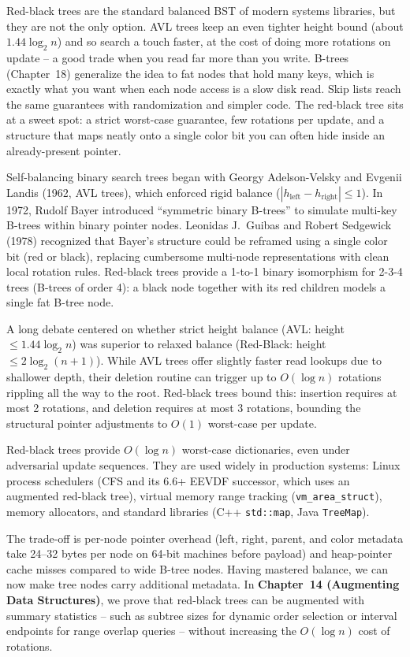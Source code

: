 \begin{aestheticbox}
Red-black trees are the standard balanced BST of modern systems libraries, but
they are not the only option. AVL trees keep an even tighter height
bound (about $1.44\log_2 n$) and so search a touch faster, at the cost of doing
more rotations on update -- a good trade when you read far more than you write.
B-trees (Chapter~18) generalize the idea to fat nodes that hold many keys, which
is exactly what you want when each node access is a slow disk read. Skip lists
reach the same guarantees with randomization and simpler code. The red-black tree
sits at a sweet spot: a strict worst-case guarantee, few rotations per update, and
a structure that maps neatly onto a single color bit you can often hide inside an
already-present pointer.
\end{aestheticbox}

\begin{historybox}
Self-balancing binary search trees began with Georgy Adelson-Velsky and Evgenii Landis (1962, AVL trees), which enforced rigid balance ($|h_{\text{left}} - h_{\text{right}}| \le 1$). In 1972, Rudolf Bayer introduced ``symmetric binary B-trees'' to simulate multi-key B-trees within binary pointer nodes. Leonidas J.~Guibas and Robert Sedgewick (1978) recognized that Bayer's structure could be reframed using a single color bit (red or black), replacing cumbersome multi-node representations with clean local rotation rules. Red-black trees provide a 1-to-1 binary isomorphism for 2-3-4 trees (B-trees of order 4): a black node together with its red children models a single fat B-tree node.

A long debate centered on whether strict height balance (AVL: height $\le 1.44 \log_2 n$) was superior to relaxed balance (Red-Black: height $\le 2 \log_2(n+1)$). While AVL trees offer slightly faster read lookups due to shallower depth, their deletion routine can trigger up to $O(\log n)$ rotations rippling all the way to the root. Red-black trees bound this: insertion requires at most 2 rotations, and deletion requires at most 3 rotations, bounding the structural pointer adjustments to $O(1)$ worst-case per update.

Red-black trees provide $O(\log n)$ worst-case dictionaries, even under adversarial update sequences. They are used widely in production systems: Linux process schedulers (CFS and its 6.6+ EEVDF successor, which uses an augmented red-black tree), virtual memory range tracking (\lstinline|vm_area_struct|), memory allocators, and standard libraries (C++ \lstinline|std::map|, Java \lstinline|TreeMap|).

The trade-off is per-node pointer overhead (left, right, parent, and color metadata take 24--32 bytes per node on 64-bit machines before payload) and heap-pointer cache misses compared to wide B-tree nodes. Having mastered balance, we can now make tree nodes carry additional metadata. In \textbf{Chapter~14 (Augmenting Data Structures)}, we prove that red-black trees can be augmented with summary statistics -- such as subtree sizes for dynamic order selection or interval endpoints for range overlap queries -- without increasing the $O(\log n)$ cost of rotations.
\end{historybox}


